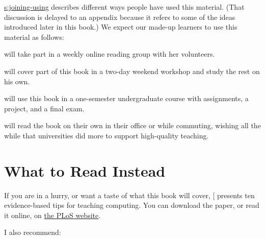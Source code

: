 \protect\hyperlink{SECTION}{s:joining-using} describes different ways people have used
this material. (That discussion is delayed to an appendix because it
refers to some of the ideas introduced later in this book.) We expect
our made-up learners to use this material as follows:

\begin{description}
\tightlist
\item[Emily]
will take part in a weekly online reading group with her volunteers.
\item[Moshe]
will cover part of this book in a two-day weekend workshop and study
the rest on his own.
\item[Samira]
will use this book in a one-semester undergraduate course with
assignments, a project, and a final exam.
\item[Gene]
will read the book on their own in their office or while commuting,
wishing all the while that universities did more to support
high-quality teaching.
\end{description}

\section{What to Read Instead}\label{s:intro-instead}

If you are in a hurry, or want a taste of what this book will cover,
{[}\protect[\hyperlink{b:Brow2018}{Brow2018}]{]} presents ten evidence-based tips for teaching
computing. You can download the paper, or read it online, on \href{https://doi.org/10.1371/journal.pcbi.1006023}{the PLoS
website}.

I also recommend:

